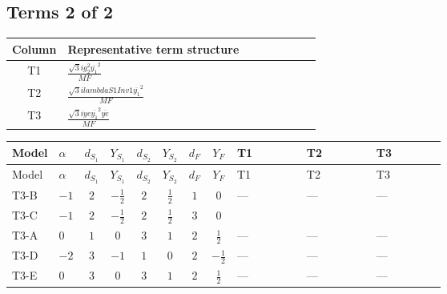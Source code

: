 \documentclass[8pt]{article}
\begin{document}
\begin{landscape}
\subsection*{Terms 2 of 2}
\begin{center}
\begin{tabular}{@{}c >{\raggedright\arraybackslash}p{0.82\linewidth}@{}}
\toprule
Column & Representative term structure \\
\midrule
T1 & \(\displaystyle \frac{\sqrt{3} i g_{2}^{2} \overline{y_{1}}^{2}}{MF}\) \\
\midrule
T2 & \(\displaystyle \frac{\sqrt{3} i lambdaS1Inv1 \overline{y_{1}}^{2}}{MF}\) \\
\midrule
T3 & \(\displaystyle \frac{\sqrt{3} i ye \overline{y_{1}}^{2} \overline{ye}}{MF}\) \\
\midrule
\bottomrule
\end{tabular}
\end{center}
\smallskip
\tiny
\begin{longtable}{@{}llcccccc >{\raggedright\arraybackslash}p{0.21\linewidth} >{\raggedright\arraybackslash}p{0.21\linewidth} >{\raggedright\arraybackslash}p{0.21\linewidth}@{}}
\toprule
Model & $\alpha$ & $d_{S_1}$ & $Y_{S_1}$ & $d_{S_2}$ & $Y_{S_2}$ & $d_F$ & $Y_F$ & T1 & T2 & T3 \\
\midrule
\endfirsthead
\toprule
Model & $\alpha$ & $d_{S_1}$ & $Y_{S_1}$ & $d_{S_2}$ & $Y_{S_2}$ & $d_F$ & $Y_F$ & T1 & T2 & T3 \\
\midrule
\endhead
T3-B & $-1$ & $2$ & $-\frac{1}{2}$ & $2$ & $\frac{1}{2}$ & $1$ & $0$ & --- & --- & --- \\
\midrule
T3-C & $-1$ & $2$ & $-\frac{1}{2}$ & $2$ & $\frac{1}{2}$ & $3$ & $0$ & \scriptsize\adjustbox{max width=\linewidth}{$\begin{gathered} \frac{\sqrt{3} i g_{2}^{2} \overline{y_{1}}^{2}}{8 MF}\end{gathered}$} & \scriptsize\adjustbox{max width=\linewidth}{$\begin{gathered} \frac{\sqrt{3} i lambdaS1Inv1 \overline{y_{1}}^{2}}{12 MF}\end{gathered}$} & \scriptsize\adjustbox{max width=\linewidth}{$\begin{gathered} - \frac{\sqrt{3} i ye \overline{y_{1}}^{2} \overline{ye}}{24 MF}\end{gathered}$} \\
\midrule
T3-A & $0$ & $1$ & $0$ & $3$ & $1$ & $2$ & $\frac{1}{2}$ & --- & --- & --- \\
\midrule
T3-D & $-2$ & $3$ & $-1$ & $1$ & $0$ & $2$ & $-\frac{1}{2}$ & --- & --- & --- \\
\midrule
T3-E & $0$ & $3$ & $0$ & $3$ & $1$ & $2$ & $\frac{1}{2}$ & --- & --- & --- \\
\midrule
\bottomrule
\end{longtable}
\clearpage

\end{landscape}
\end{document}
